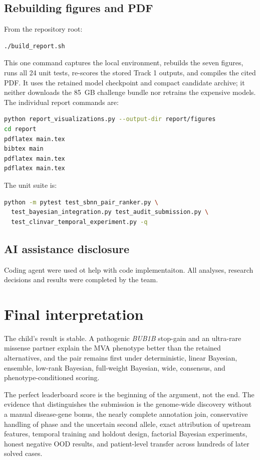\documentclass[11pt]{article}
\begin{document}
\subsection{Rebuilding figures and PDF}
From the repository root:
\begin{lstlisting}[language=bash]
./build_report.sh
\end{lstlisting}
This one command captures the local environment, rebuilds the seven figures, runs all 24 unit tests, re-scores the stored Track 1 outputs, and compiles the cited PDF. It uses the retained model checkpoint and compact candidate archive; it neither downloads the 85~GB challenge bundle nor retrains the expensive models. The individual report commands are:
\begin{lstlisting}[language=bash]
python report_visualizations.py --output-dir report/figures
cd report
pdflatex main.tex
bibtex main
pdflatex main.tex
pdflatex main.tex
\end{lstlisting}

The unit suite is:
\begin{lstlisting}[language=bash]
python -m pytest test_sbnn_pair_ranker.py \
  test_bayesian_integration.py test_audit_submission.py \
  test_clinvar_temporal_experiment.py -q
\end{lstlisting}
\subsection{AI assistance disclosure}

Coding agent were used ot help with code implementaiton. All analyses, research decisions and results were completed by the team.

\section{Final interpretation}

The child's result is stable. A pathogenic \textit{BUB1B} stop-gain and an ultra-rare missense partner explain the MVA phenotype better than the retained alternatives, and the pair remains first under deterministic, linear Bayesian, ensemble, low-rank Bayesian, full-weight Bayesian, wide, consensus, and phenotype-conditioned scoring.

The perfect leaderboard score is the beginning of the argument, not the end. The evidence that distinguishes the submission is the genome-wide discovery without a manual disease-gene bonus, the nearly complete annotation join, conservative handling of phase and the uncertain second allele, exact attribution of upstream features, temporal training and holdout design, factorial Bayesian experiments, honest negative OOD results, and patient-level transfer across hundreds of later solved cases.
\end{document}
